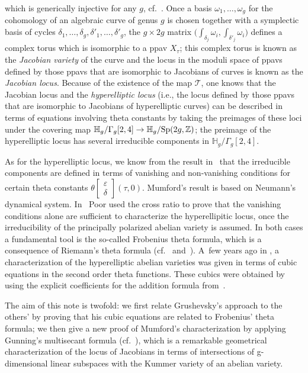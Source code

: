 \documentclass[pdftex]{sigma}
\numberwithin{equation}{section}
\newcommand{\de}{\delta}
\newcommand{\ep}{\varepsilon}
\newcommand{\HH}{{\mathbb{H}}}
\newcommand{\ZZ}{{\mathbb{Z}}}
\def\ZZ{{\mathbb Z}}
\begin{document}
which is generically injective for any $g$, cf.~\cite{SM}. Once a basis $\omega_1, \dots , \omega_g$ for the cohomology of an algebraic curve of genus $g$ is chosen together with a symplectic basis of cycles $\de_1, \dots , \de_g, \de'_1, \dots, \de'_g$, the $g \times 2g$ matrix $\big(\int_{\de_j}\omega_i, \int_{\de'_j}\omega_i\big)$ defines a complex torus which is isomorphic to a ppav $X_{\tau}$; this complex torus is known as the {\it Jacobian variety} of the curve and the locus in the moduli space of ppavs defined by those ppavs that are isomorphic to Jacobians of curves is known as the {\it Jacobian locus}. Because of the existence of the map $\mathcal{T}$, one knows that the Jacobian locus and the {\it hyperelliptic locus} (i.e., the locus defined by those ppavs that are isomorphic to Jacobians of hyperelliptic curves) can be described in terms of equations involving theta constants by taking the preimages of these loci under the covering map $\HH_g /\Gamma_g[2,4] \to \HH_g /{\rm Sp}(2g, \ZZ)$; the preimage of the hyperelliptic locus has several irreducible components in $\HH_g /\Gamma_g[2,4]$.

As for the hyperelliptic locus, we know from the result in~\cite{mu} that the irreducible components are defined in terms of vanishing and non-vanishing conditions for certain theta constants $\theta\left[\begin{smallmatrix}\ep \\ \de \end{smallmatrix}\right] (\tau,0)$. Mumford's result is based on Neumann's dynamical system. In~\cite{po} Poor used the cross ratio to prove that the vanishing conditions alone are sufficient to characterize the hyperellipitic locus, once the irreducibility of the principally polarized abelian variety is assumed. In both cases a fundamental tool is the so-called Frobenius theta formula, which is a consequence of Riemann's theta formula (cf.~\cite{FR} and~\cite{mu}). A~few years ago in \cite{Gr}, a characterization of the hyperelliptic abelian varieties was given in terms of cubic equations in the second order theta functions. These cubics were obtained by using the explicit coefficients for the addition formula from~\cite{BK2}.

The aim of this note is twofold: we first relate Grushevsky's approach to the others' by proving that his cubic equations are related to Frobenius' theta formula; we then give a new proof of Mumford's characterization by applying Gunning's multisecant formula (cf.~\cite{Gu}), which is a remarkable geometrical characterization of the locus of Jacobians in terms of intersections of g-dimensional linear subspaces with the Kummer variety of an abelian variety.
\end{document}
